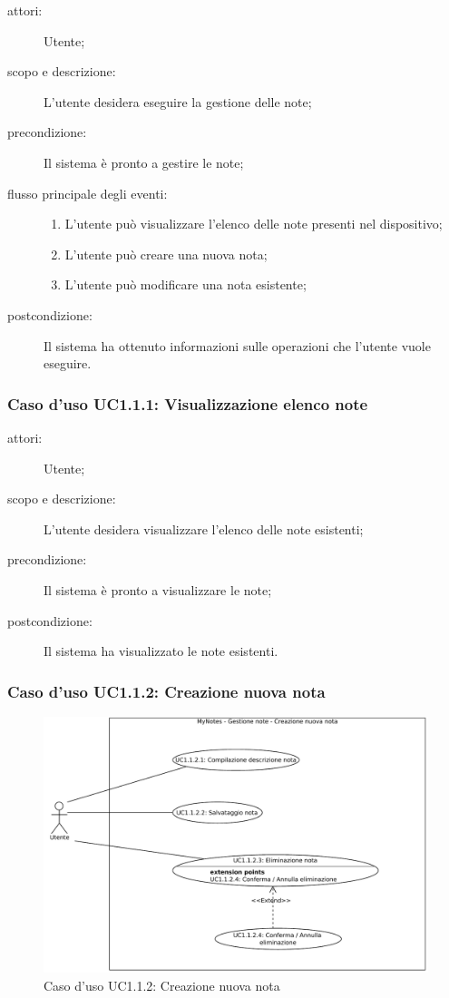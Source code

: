 \begin{description}
\item[attori:] Utente;
\item[scopo e descrizione:] L'utente desidera eseguire la gestione delle note;
\item[precondizione:] Il sistema è pronto a gestire le note;
\item[flusso principale degli eventi:] \hfill 
	\begin{enumerate}
	\item L'utente può visualizzare l'elenco delle note presenti nel dispositivo;
	\item L'utente può creare una nuova nota;
	\item L'utente può modificare una nota esistente;
	\end{enumerate}
\item[postcondizione:] Il sistema ha ottenuto informazioni sulle operazioni che l'utente vuole eseguire.
\end{description}

\subsubsection{Caso d'uso UC1.1.1: Visualizzazione elenco note}
\begin{description}
\item[attori:] Utente;
\item[scopo e descrizione:] L'utente desidera visualizzare l'elenco delle note esistenti;
\item[precondizione:] Il sistema è pronto a visualizzare le note;
\item[postcondizione:] Il sistema ha visualizzato le note esistenti.
\end{description}

\subsubsection{Caso d'uso UC1.1.2: Creazione nuova nota}
\begin{figure}[htb]
\centering
\includegraphics[scale=0.5]{gfx/useCase/MN_UC1-1-2_Creazione_nuova_nota.pdf}
\caption{Caso d'uso UC1.1.2: Creazione nuova nota}
\label{fig:My notes UC1.1.2}
\end{figure}

